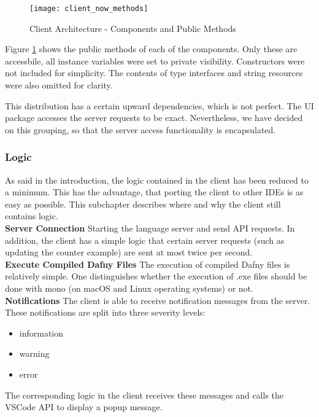 \begin{figure}[H]
    \centering
    \texttt{[image: client\_now\_methods]}
    \caption{Client Architecture - Components and Public Methods}
    \label{fig:client_now_methods}
\end{figure}

Figure \ref{fig:client_now_methods} shows the public methods of each of the components.
Only these are accessbile, all instance variables were set to private visibility.
Constructors were not included for simplicity.
The contents of type interfaces and string resources were also omitted for clarity.


This distribution has a certain upward dependencies, which is not perfect.
The UI package accesses the server requests to be exact.
Nevertheless, we have decided on this grouping,
so that the server access functionality is encapsulated.

\subsubsection{Logic}
As said in the introduction, the logic contained in the client has been reduced to a minimum.
This has the advantage, that porting the client to other IDEs is as easy as possible.
This subchapter describes where and why the client still contains logic.\\

{\bf Server Connection} \textendash{}
Starting the language server and send API requests.
In addition, the client has a simple logic that certain server requests (such as updating the counter example) are sent at most twice per second. \\

{\bf Execute Compiled Dafny Files} \textendash{}
The execution of compiled Dafny files is relatively simple.
One distinguishes whether the execution
of .exe files should be done with mono (on macOS and Linux operating systems) or not. \\

{\bf Notifications} \textendash{}
The client is able to receive notification messages from the server.
These notifications are split into three severity levels:
\begin{itemize}
    \item information
    \item warning
    \item error
\end{itemize}
The corresponding logic in the client receives these messages and calls the VSCode API to display a popup message. \\

